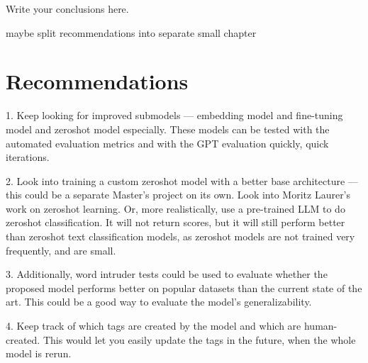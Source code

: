 Write your conclusions here.

maybe split recommendations into separate small chapter

\section{Recommendations}
1. Keep looking for improved submodels — embedding model and fine-tuning model and zeroshot model especially. These models can be tested with the automated evaluation metrics and with the GPT evaluation quickly, quick iterations.

2. Look into training a custom zeroshot model with a better base architecture — this could be a separate Master's project on its own. Look into Moritz Laurer's work on zeroshot learning. Or, more realistically, use a pre-trained LLM to do zeroshot classification. It will not return scores, but it will still perform better than zeroshot text classification models, as zeroshot models are not trained very frequently, and are small.

3. Additionally, word intruder tests could be used to evaluate whether the proposed model performs better on popular datasets than the current state of the art. This could be a good way to evaluate the model's generalizability.

4. Keep track of which tags are created by the model and which are human-created. This would let you easily update the tags in the future, when the whole model is rerun.